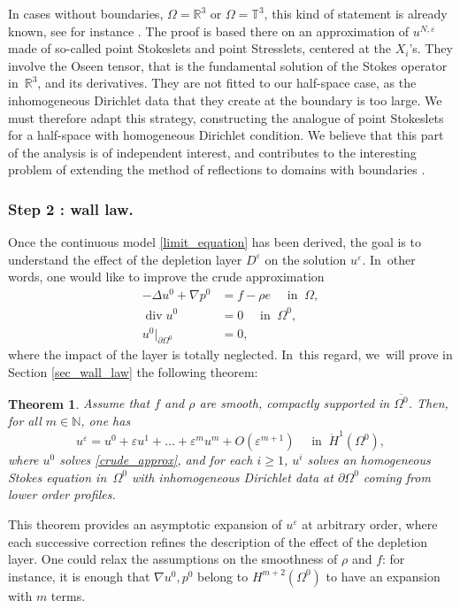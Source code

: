 \documentclass[JEP,XML,SOM,Unicode,NoEqCountersInSection,published]{cedram}
\renewcommand{\div}{\operatorname{div}}
\theoremstyle{plain}
\newtheorem{thm}{Theorem}[section]
\theoremstyle{definition}
\let\pa\partial
\let\na\nabla
\let\eps\varepsilon
\newcommand{\R}{\mathbb{R}}
\newcommand{\T}{\mathbb{T}}
\newcommand{\N}{\mathbb{N}}
\begin{document}
In cases without boundaries, $\Omega = \R^3$ or $\Omega = \T^3$, this kind of statement is already known, see for instance \cite{Hofer&Schubert}. The proof is based there on an approximation of $u^{N,\eps}$ made of so-called point Stokeslets and point Stresslets, centered at the $X_i$'s. They involve the Oseen tensor, that is the fundamental solution of the Stokes operator in~$\R^3$, and its derivatives. They are not fitted to our half-space case, as the inhomogeneous Dirichlet data that they create at the boundary is too large. We must therefore adapt this strategy, constructing the analogue of point Stokeslets for a half-space with homogeneous Dirichlet condition. We believe that this part of the analysis is of independent interest, and contributes to the interesting problem of extending the method of reflections to domains with boundaries \cite{Hoefer19}.

\subsubsection*{Step 2 : wall law.}
Once the continuous model \eqref{limit_equation} has been derived, the goal is to understand the effect of the depletion layer $D^\eps$ on the solution $u^\eps$. In~other words, one would like to improve the crude approximation
\begin{equation} \label{crude_approx}
\begin{aligned}
-\Delta u^0 + \na p^0 &= f - \rho e \quad \text{ in } \: \Omega, \\
\div u^0 & = 0 \quad \text{ in } \: \Omega^0, \\
u^0 \vert_{\pa \Omega^0} & = 0,
\end{aligned}
\end{equation}
where the impact of the layer is totally neglected. In~this regard, we~will prove in Section \ref{sec_wall_law} the following theorem:
\begin{thm} \label{thm2}
Assume that $f$ and $\rho$ are smooth, compactly supported in $\overline{\Omega^0}$. Then, for all $m \in \N$, one has
\[
u^\eps = u^0 + \eps u^1 + \dots + \eps^m u^m + O(\eps^{m+1}) \quad \text{ in } \: \dot{H}^1(\Omega^0),
\]
where $u^0$ solves \eqref{crude_approx}, and for each $i \ge 1$, $u^i$ solves an homogeneous Stokes equation in~$\Omega^0$ with inhomogeneous Dirichlet data at $\pa \Omega^0$ coming from lower order profiles.
\end{thm}
This theorem provides an asymptotic expansion of $u^\eps$ at arbitrary order, where each successive correction refines the description of the effect of the depletion layer. One could relax the assumptions on the smoothness of $\rho$ and $f$: for instance, it is enough that $\na u^0,p^0$ belong to $H^{m+2}(\Omega^0)$ to have an expansion with $m$ terms.
\end{document}
